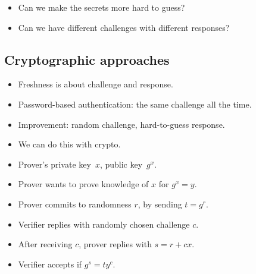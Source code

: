 \begin{frame}
  \begin{question}
    \begin{itemize}
      \item Can we make the secrets more hard to guess?
      \item Can we have different challenges with different responses?
    \end{itemize}
  \end{question}
\end{frame}

\subsection{Cryptographic approaches}

\begin{frame}
  \begin{solution}
    \begin{itemize}
      \item Freshness is about challenge and response.
      \item Password-based authentication: the same challenge all the time.
      \item Improvement: random challenge, hard-to-guess response.
      \item We can do this with crypto.
    \end{itemize}
  \end{solution}
\end{frame}

\begin{frame}
  \begin{example}
    \begin{itemize}
      \item Prover's private key~\(x\), public key~\(g^x\).
      \item Prover wants to prove knowledge of \(x\) for \(g^x = y\).

        \pause

      \item Prover commits to randomness \(r\), by sending \(t = g^r\).

        \pause

      \item Verifier replies with randomly chosen challenge \(c\).

        \pause

      \item After receiving \(c\), prover replies with \(s = r + cx\).

        \pause{}

      \item Verifier accepts if \(g^s = t y^c\).
    \end{itemize}
  \end{example}
\end{frame}

